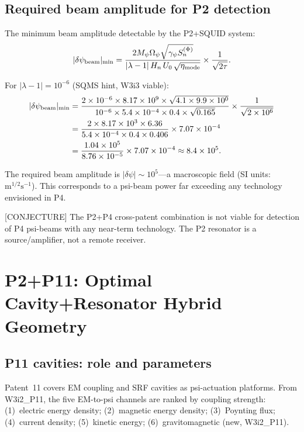 \documentclass[11pt,twocolumn]{article}
\newcommand{\dpsi}{\delta\psi}
\newcommand{\lam}{\lambda}
\newcommand{\Opsi}{\Omega_\psi}
\newcommand{\gpsi}{\gamma_\psi}
\newcommand{\Mpsi}{M_\psi}
\newcommand{\ee}[1]{\times 10^{#1}}
\theoremstyle{definition}
\theoremstyle{remark}
\begin{document}
\subsection{Required beam amplitude for P2 detection}
\label{sec:P4_required}

The minimum beam amplitude detectable by the P2+SQUID system:
\begin{equation}
|\dpsi_{\rm beam}|_{\rm min} = \frac{2\Mpsi\Opsi\sqrt{\gpsi S_n^{(\Phi)}}}
{|\lam-1|\,H_n\,U_0\,\sqrt{\eta_{\rm mode}}}\times\frac{1}{\sqrt{2\tau}}.
\label{eq:dpsi_beam_min}
\end{equation}

For $|\lam-1| = 10^{-6}$ (SQMS hint, W3i3 viable):
\begin{align}
|\dpsi_{\rm beam}|_{\rm min}
&= \frac{2\times10^{-6}\times8.17\ee{9}\times\sqrt{4.1\times9.9\ee{0}}}
{10^{-6}\times5.4\ee{-4}\times0.4\times\sqrt{0.165}}
\times\frac{1}{\sqrt{2\ee{6}}}
\nonumber\\
&= \frac{2\times8.17\ee{3}\times6.36}{5.4\ee{-4}\times0.4\times0.406}
\times7.07\ee{-4}
\nonumber\\
&= \frac{1.04\ee{5}}{8.76\ee{-5}}\times7.07\ee{-4}
\approx 8.4\ee{5}.
\label{eq:dpsi_min_P4}
\end{align}

The required beam amplitude is $|\dpsi| \sim 10^5$---a macroscopic
field (SI units: $\mathrm{m}^{1/2}\mathrm{s}^{-1}$).  This corresponds
to a psi-beam power far exceeding any technology envisioned in P4.

[CONJECTURE] The P2+P4 cross-patent combination is not viable for
detection of P4 psi-beams with any near-term technology.  The P2
resonator is a source/amplifier, not a remote receiver.

\section{P2+P11: Optimal Cavity+Resonator Hybrid Geometry}
\label{sec:hybrid}

\subsection{P11 cavities: role and parameters}
\label{sec:P11_role}

Patent~11 covers EM coupling and SRF cavities as psi-actuation platforms.
From W3i2\_P11, the five EM-to-psi channels are ranked by coupling strength:
(1)~electric energy density; (2)~magnetic energy density; (3)~Poynting flux;
(4)~current density; (5)~kinetic energy; (6)~gravitomagnetic (new, W3i2\_P11).
\end{document}
